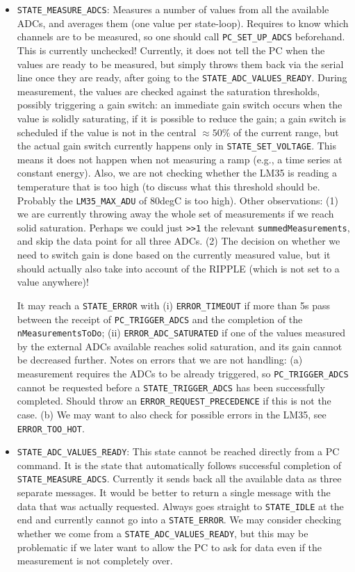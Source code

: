 \documentclass[11pt,a4paper,english]{article}
\begin{document}
\begin{itemize}
\item \texttt{STATE\_MEASURE\_ADCS}: Measures a number of values from all the available ADCs, and averages them (one value per state-loop). Requires to know which channels are to be measured, so one should call \texttt{PC\_SET\_UP\_ADCS} beforehand. This is currently unchecked! Currently, it does not tell the PC when the values are ready to be measured, but simply throws them back via the serial line once they are ready, after going to the \texttt{STATE\_ADC\_VALUES\_READY}. During measurement, the values are checked against the saturation thresholds, possibly triggering a gain switch: an immediate gain switch occurs when the value is solidly saturating, if it is possible to reduce the gain; a gain switch is scheduled if the value is not in the central $\approx50\%$ of the current range, but the actual gain switch currently happens only in \texttt{STATE\_SET\_VOLTAGE}. This means it does not happen when not measuring a ramp (e.g., a time series at constant energy). Also, we are not checking whether the LM35 is reading a temperature that is too high (to discuss what this threshold should be. Probably the \texttt{LM35\_MAX\_ADU} of 80degC is too high). Other observations: (1) we are currently throwing away the whole set of measurements if we reach solid saturation. Perhaps we could just \texttt{>>1} the relevant \texttt{summedMeasurements}, and skip the data point for all three ADCs. (2) The decision on whether we need to switch gain is done based on the currently measured value, but it should actually also take into account of the RIPPLE (which is not set to a value anywhere)!

	It may reach a \texttt{STATE\_ERROR} with (i) \texttt{ERROR\_TIMEOUT} if more than 5s pass between the receipt of  \texttt{PC\_TRIGGER\_ADCS} and the completion of the \texttt{nMeasurementsToDo}; (ii) \texttt{ERROR\_ADC\_SATURATED} if one of the values measured by the external ADCs available reaches solid saturation, and its gain cannot be decreased further. Notes on errors that we are not handling: (a) measurement requires the ADCs to be already triggered, so \texttt{PC\_TRIGGER\_ADCS} cannot be requested before a \texttt{STATE\_TRIGGER\_ADCS} has been successfully completed. Should throw an \texttt{ERROR\_REQUEST\_PRECEDENCE} if this is not the case. (b) We may want to also check for possible errors in the LM35, see \texttt{ERROR\_TOO\_HOT}.

\item \texttt{STATE\_ADC\_VALUES\_READY}: This state cannot be reached directly from a PC command. It is the state that automatically follows successful completion of \texttt{STATE\_MEASURE\_ADCS}. Currently it sends back all the available data as three separate messages. It would be better to return a single message with the data that was actually requested. Always goes straight to \texttt{STATE\_IDLE} at the end and currently cannot go into a \texttt{STATE\_ERROR}. We may consider checking whether we come from a \texttt{STATE\_ADC\_VALUES\_READY}, but this may be problematic if we later want to allow the PC to ask for data even if the measurement is not completely over.


\end{itemize}
\end{document}
